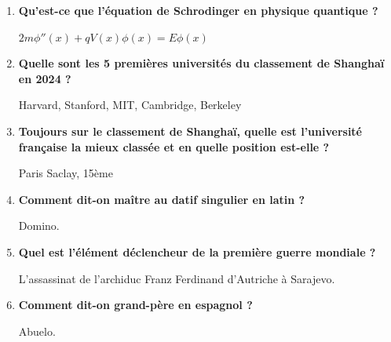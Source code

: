 \documentclass[12pt]{article}
\begin{document}
\begin{enumerate}
  \item \textbf{Qu'est-ce que l'équation de Schrodinger en physique quantique ?}
  
  $2m \phi''(x) + qV (x)\phi(x) = E\phi(x)$
  
  \item \textbf{Quelle sont les 5 premières universités du classement de Shanghaï en 2024 ?}
  
  Harvard, Stanford, MIT, Cambridge, Berkeley
  
  \item \textbf{Toujours sur le classement de Shanghaï, quelle est l'université française la mieux classée et en quelle position est-elle ?}
  
  Paris Saclay, 15ème
   
  \item \textbf{Comment dit-on maître au datif singulier en latin ?}
  
  Domino.
  
  \item \textbf{Quel est l'élément déclencheur de la première guerre mondiale ?}
  
  L'assassinat de l'archiduc Franz Ferdinand d'Autriche à Sarajevo.

  \item \textbf{Comment dit-on grand-père en espagnol ?}
  
  Abuelo.

\end{enumerate}
\end{document}
